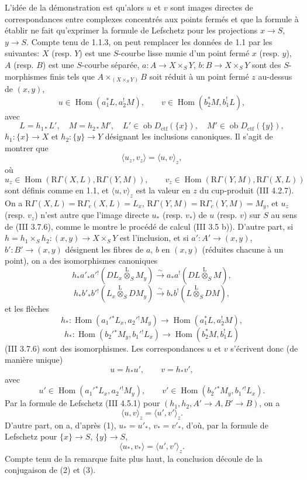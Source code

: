\documentclass[11pt]{article}
\DeclareMathOperator{\Hom}{Hom}
\newcommand{\R}{\mathrm{R}}\newcommand{\RHomCore}{\mathrm{RHom}}
\providecommand{\lten}{\overset{\mathrm L}{\otimes}}
\providecommand{\Ob}{\operatorname{ob}}
\providecommand{\Hom}{\operatorname{Hom}}
\providecommand{\lten}{\overset{\mathrm L}{\otimes}}
\providecommand{\lten}{\overset{\mathrm L}{\otimes}}
\providecommand{\Ob}{\operatorname{ob}}
\providecommand{\R}{\mathrm R}
\providecommand{\lten}{\overset{\mathrm L}{\otimes}}
\providecommand{\lten}{\overset{\mathrm L}{\otimes}}
\providecommand{\Ob}{\operatorname{Ob}}
\providecommand{\lten}{\overset{\mathrm L}{\otimes}}
\providecommand{\Hom}{\operatorname{Hom}}
\providecommand{\Ob}{\operatorname{ob}}
\providecommand{\Ob}{\operatorname{Ob}}
\providecommand{\lten}{\overset{\mathrm L}{\otimes}}
\begin{document}
L'idée de la démonstration est qu'alors $u$ et $v$ sont images directes de correspondances entre complexes concentrés aux points fermés et que la formule à établir ne fait qu'exprimer la formule de Lefschetz pour les projections $x\to S$, $y\to S$. Compte tenu de 1.1.3, on peut remplacer les données de 1.1 par les suivantes: $X$ (resp. $Y$) est une $S$-courbe lisse munie d'un point fermé $x$ (resp. $y$), $A$ (resp. $B$) est une $S$-courbe séparée, $a:A\to X\times_S Y$, $b:B\to X\times_S Y$ sont des $S$-morphismes finis tels que $A\times_{(X\times_SY)}B$ soit réduit à un point fermé $z$ au-dessus de $(x,y)$,
\[
u\in\Hom(a_1^*L,a_2^!M),\qquad v\in\Hom(b_2^*M,b_1^!L),
\]
avec
\[
L=h_{1*}L',\quad M=h_{2*}M',\quad
L'\in\Ob D_{\mathrm{ctf}}(\{x\}),\quad M'\in\Ob D_{\mathrm{ctf}}(\{y\}),
\]
$h_1:\{x\}\to X$ et $h_2:\{y\}\to Y$
désignant les inclusions canoniques. Il s'agit de montrer que
\[
\langle u_z,v_z\rangle=\langle u,v\rangle_z,
\]
où
\[
u_z\in\Hom(\R\Gamma(X,L),\R\Gamma(Y,M)),\qquad
v_z\in\Hom(\R\Gamma(Y,M),\R\Gamma(X,L))
\]
sont définis comme en 1.1, et $\langle u,v\rangle_z$ est la valeur en $z$ du cup-produit (III 4.2.7). On a $\R\Gamma(X,L)=\R\Gamma_c(X,L)=L_x$, $\R\Gamma(Y,M)=\R\Gamma_c(Y,M)=M_y$, et $u_z$ (resp. $v_z$) n'est autre que l'image directe $u_*$ (resp. $v_*$) de $u$ (resp. $v$) sur $S$ au sens de (III 3.7.6), comme le montre le procédé de calcul (III 3.5 b)). D'autre part, si $h=h_1\times_Sh_2:(x,y)\to X\times_SY$ est l'inclusion, et si $a':A'\to(x,y)$, $b':B'\to(x,y)$ désignent les fibres de $a$, $b$ en $(x,y)$ (réduites chacune à un point), on a des isomorphismes canoniques
\[
h_*a'_*a'{}^!(DL_x\lten_SM_y)
 \xrightarrow{\sim} a_*a^!(DL\lten_SM),
\]
\[
h_*b'_*b'{}^!(L_x\lten_SDM_y)
 \xrightarrow{\sim} b_*b^!(L\lten_SDM),
\]
et les flèches
\[
h_*:\Hom(a_1'{}^*L_x,a_2'{}^!M_y)\to \Hom(a_1^*L,a_2^!M),
\]
\[
h_*:\Hom(b_2'{}^*M_y,b_1'{}^!L_x)\to \Hom(b_2^*M,b_1^!L)
\]
(III 3.7.6) sont des isomorphismes. Les correspondances $u$ et $v$ s'écrivent donc (de manière unique)
\begin{equation}\tag{1}
u=h_*u',\qquad v=h_*v',
\end{equation}
avec
\[
u'\in\Hom(a_1'{}^*L_x,a_2'{}^!M_y),\qquad
v'\in\Hom(b_2'{}^*M_y,b_1'{}^!L_x).
\]
Par la formule de Lefschetz (III 4.5.1) pour $(h_1,h_2,A'\to A,B'\to B)$, on a
\begin{equation}\tag{2}
\langle u,v\rangle_z=\langle u',v'\rangle_z .
\end{equation}
D'autre part, on a, d'après (1), $u_*=u'_*$, $v_*=v'_*$, d'où, par la formule de Lefschetz pour $\{x\}\to S$, $\{y\}\to S$,
\begin{equation}\tag{3}
\langle u_*,v_*\rangle=\langle u',v'\rangle_z .
\end{equation}
Compte tenu de la remarque faite plus haut, la conclusion découle de la conjugaison de (2) et (3).
\end{document}
